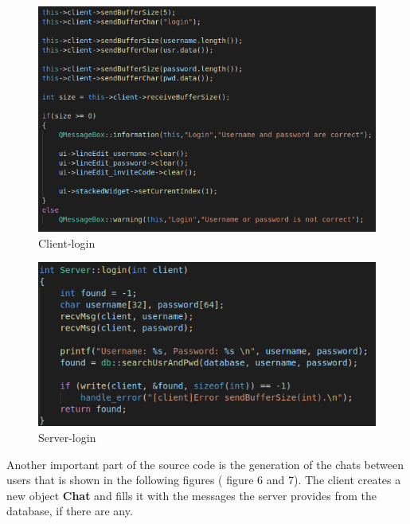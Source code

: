 \documentclass[runningheads]{llncs}
\begin{document}
\begin{figure}[H]
\includegraphics[]{images/client-login.png}
\caption{Client-login}
\end{figure}

\newpage 
\begin{figure}[H]
\begin{center}
\includegraphics[]{images/server-login.png}
\caption{Server-login}
\end{center}
\end{figure}

\par Another important part of the source code is the generation of the chats between users that is shown in the following figures ( figure 6 and 7). The client creates a new object \textbf{Chat} and fills it with the messages the server provides from the database, if there are any. 
\end{document}
